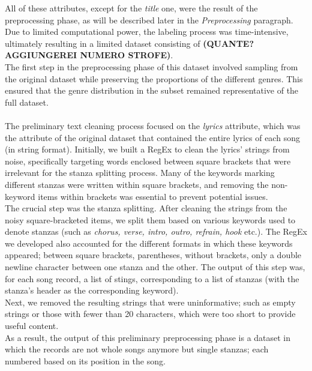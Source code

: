 All of these attributes, except for the \textit{title} one, were the result of the preprocessing phase, as will be described later in the \textit{Preprocessing} paragraph.\\
Due to limited computational power, the labeling process was time-intensive, ultimately resulting in a limited dataset consisting of \textbf{(QUANTE? AGGIUNGEREI NUMERO STROFE)}.\\

The first step in the preprocessing phase of this dataset involved sampling from the original dataset while preserving the proportions of the different genres. 
This ensured that the genre distribution in the subset remained representative of the full dataset.\\
\\
The preliminary text cleaning process focused on the \textit{lyrics} attribute, which was the attribute of the original dataset that contained
the entire lyrics of each song (in string format). Initially, we built a RegEx to clean the lyrics' strings from noise, specifically targeting words enclosed between square brackets that were irrelevant for the stanza splitting process.
Many of the keywords marking different stanzas were written within square brackets, and removing the non-keyword items within brackets was essential to prevent potential issues. \\
The crucial step was the stanza splitting. After cleaning the strings from the noisy square-bracketed items, we split them based on various keywords used to denote stanzas (such as \textit{chorus, verse, intro, outro, refrain, hook} etc.). 
The RegEx we developed also accounted for the different formats in which these keywords appeared; between square brackets, parentheses, without brackets, only a double newline character between one stanza and the other.
The output of this step was, for each song record, a list of stings, corresponding to a list of stanzas (with the stanza's header as the corresponding keyword). \\
Next, we removed the resulting strings that were uninformative; such as empty strings or those with fewer than 20 characters, which were too short to provide useful content. \\
As a result, the output of this preliminary preprocessing phase is a dataset in which the records are not whole songs anymore but single stanzas; each numbered based on its position in the song. \\
